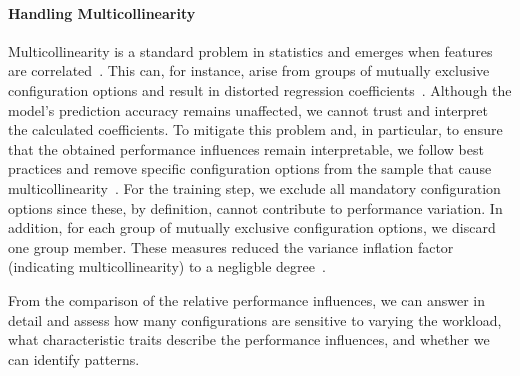 {\paragraph*{Handling Multicollinearity} Multicollinearity is a standard problem in statistics and emerges when features are correlated~\cite{Daoud_2017}. This can, for instance, arise from groups of mutually exclusive configuration options and result in distorted regression coefficients~\cite{dorn2020}. Although the model's prediction accuracy remains unaffected, we cannot trust and interpret the calculated coefficients. To mitigate this problem and, in particular, to ensure that the obtained performance influences remain interpretable, we follow best practices and remove specific configuration options from the sample that cause multicollinearity~\cite{dorn2020}. For the training step, we exclude all mandatory configuration options since these, by definition, cannot contribute to performance variation. In addition, for each group of mutually exclusive configuration options, we discard one group member. These measures reduced the variance inflation factor (indicating multicollinearity) to a negligble degree~\cite{o2007caution}.

From the comparison of the relative performance influences, we can answer  in detail and assess how many configurations are sensitive to varying the workload, what characteristic traits describe the performance influences, and whether we can identify patterns.
}

